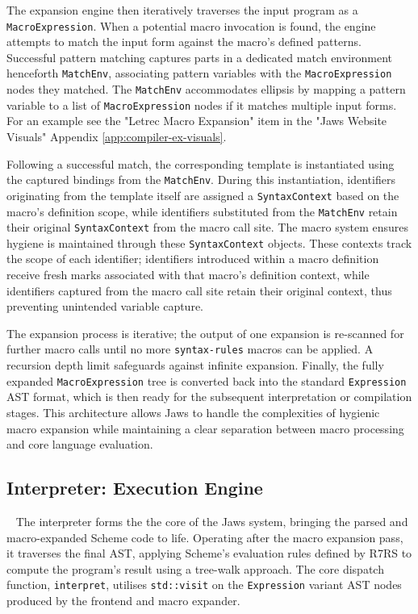 \documentclass[final]{cmpreport_02}
\begin{document}
The expansion engine then iteratively traverses the input program as a \linebreak\texttt{MacroExpression}. When a potential macro invocation is found, the engine attempts to match the input form against the macro's defined patterns. Successful pattern matching captures parts in a dedicated match environment henceforth \texttt{MatchEnv}, associating pattern variables with the \texttt{MacroExpression} nodes they matched. The \texttt{MatchEnv} accommodates ellipsis by mapping a pattern variable to a list of \texttt{MacroExpression} nodes if it matches multiple input forms. For an example see the "Letrec Macro Expansion" item in the "Jaws Website Visuals" Appendix \ref{app:compiler-ex-visuals}.\newline

Following a successful match, the corresponding template is instantiated using the captured bindings from the \texttt{MatchEnv}. During this instantiation, identifiers originating from the template itself are assigned a \texttt{SyntaxContext} based on the macro's definition scope, while identifiers substituted from the \texttt{MatchEnv} retain their original \texttt{SyntaxContext} from the macro call site. The macro system ensures hygiene is maintained through these \texttt{SyntaxContext} objects. These contexts track the scope of each identifier; identifiers introduced within a macro definition receive fresh marks associated with that macro's definition context, while identifiers captured from the macro call site retain their original context, thus preventing unintended variable capture.\newline

The expansion process is iterative; the output of one expansion is re-scanned for further macro calls until no more \texttt{syntax-rules} macros can be applied. A recursion depth limit safeguards against infinite expansion. Finally, the fully expanded \texttt{MacroExpression} tree is converted back into the standard \texttt{Expression} AST format, which is then ready for the subsequent interpretation or compilation stages. This architecture allows Jaws to handle the complexities of hygienic macro expansion while maintaining a clear separation between macro processing and core language evaluation. 

\subsection{Interpreter: Execution Engine} 
The interpreter forms the the core of the Jaws system, bringing the parsed and macro-expanded Scheme code to life. Operating after the macro expansion pass, it traverses the final AST, applying Scheme's evaluation rules defined by R7RS to compute the program's result using a tree-walk approach. The core dispatch function, \texttt{interpret}, utilises \texttt{std::visit} on the \texttt{Expression} variant AST nodes produced by the frontend and macro expander.
\end{document}
